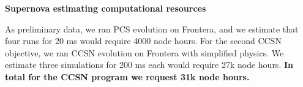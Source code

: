 \documentclass[12pt]{article}
\begin{document}
\textbf{Supernova estimating computational resources}

As preliminary data, we ran PCS evolution on Frontera, and we estimate that four runs for 20 ms would require 4000 node hours.  For the second CCSN objective, we ran CCSN evolution on Frontera with simplified physics.  We estimate three simulations for 200 ms each would require 27k node hours.  \textbf{In total for the CCSN program we request 31k node hours.}





\renewcommand\bibsection{\section*{References}}
\setlength{\bibsep}{2pt}
\begin{multicols}{2}
{\footnotesize }
\end{multicols}
\end{document}
